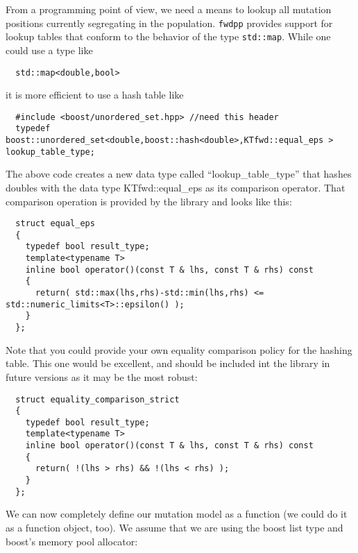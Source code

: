 \documentclass{article}
\begin{document}
From a programming point of view, we need a means to lookup all mutation positions currently segregating in the population.  \texttt{fwdpp} provides support for lookup tables that conform to the behavior of the type \texttt{std::map}.  While one could use a type like 
\begin{lstlisting}
  std::map<double,bool>
\end{lstlisting}
it is more efficient to use a hash table like 
\begin{lstlisting}
  #include <boost/unordered_set.hpp> //need this header
  typedef boost::unordered_set<double,boost::hash<double>,KTfwd::equal_eps > lookup_table_type;
\end{lstlisting}

The above code creates a new data type called ``lookup\_table\_type'' that hashes doubles with the data type KTfwd::equal\_eps as its comparison operator.  That comparison operation is provided by the library and looks like this:
\begin{lstlisting}
  struct equal_eps
  {
    typedef bool result_type;
    template<typename T>
    inline bool operator()(const T & lhs, const T & rhs) const
    {
      return( std::max(lhs,rhs)-std::min(lhs,rhs) <= std::numeric_limits<T>::epsilon() );
    }
  };
\end{lstlisting}

Note that you could provide your own equality comparison policy for the hashing table.  This one would be excellent, and should be included int the library in future versions as it may be the most robust:
\begin{lstlisting}
  struct equality_comparison_strict
  {
    typedef bool result_type;
    template<typename T>
    inline bool operator()(const T & lhs, const T & rhs) const
    {
      return( !(lhs > rhs) && !(lhs < rhs) );
    }
  };
\end{lstlisting}

We can now completely define our mutation model as a function (we could do it as a function object, too).  We assume that we are using the boost list type and boost's memory pool allocator:
\end{document}

